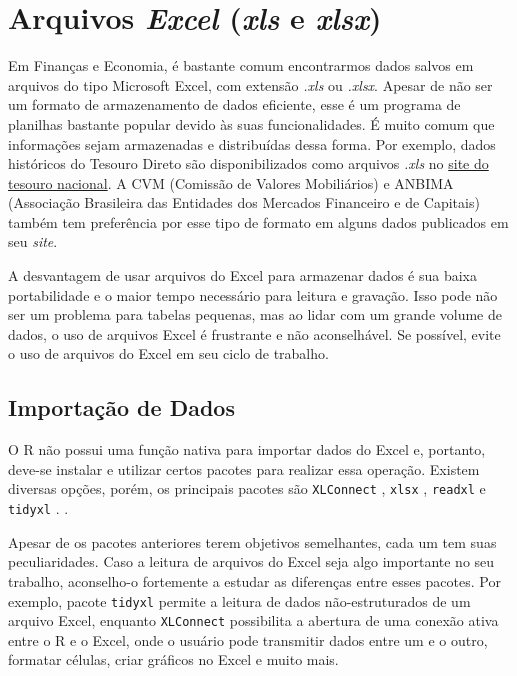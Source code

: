 \documentclass[
  11pt,
]{book}
\begin{document}
\hypertarget{arquivos-excel-xls-e-xlsx}{%
\section{\texorpdfstring{Arquivos \emph{Excel} (\emph{xls} e \emph{xlsx})}{Arquivos Excel (xls e xlsx)}}\label{arquivos-excel-xls-e-xlsx}}

Em Finanças e Economia, é bastante comum encontrarmos dados salvos em arquivos do tipo Microsoft Excel, com extensão \emph{.xls} ou \emph{.xlsx}. Apesar de não ser um formato de armazenamento de dados eficiente, esse é um programa de planilhas bastante popular devido às suas funcionalidades. É muito comum que informações sejam armazenadas e distribuídas dessa forma. Por exemplo, dados históricos do Tesouro Direto são disponibilizados como arquivos \emph{.xls} no \href{http://www.tesouro.gov.br/tesouro-direto-balanco-e-estatisticas}{site do tesouro nacional}. A CVM (Comissão de Valores Mobiliários) e ANBIMA (Associação Brasileira das Entidades dos Mercados Financeiro e de Capitais) também tem preferência por esse tipo de formato em alguns dados publicados em seu \emph{site}.

A desvantagem de usar arquivos do Excel para armazenar dados é sua baixa portabilidade e o maior tempo necessário para leitura e gravação. Isso pode não ser um problema para tabelas pequenas, mas ao lidar com um grande volume de dados, o uso de arquivos Excel é frustrante e não aconselhável. Se possível, evite o uso de arquivos do Excel em seu ciclo de trabalho.

\hypertarget{importauxe7uxe3o-de-dados-1}{%
\subsection{Importação de Dados}\label{importauxe7uxe3o-de-dados-1}}

O R não possui uma função nativa para importar dados do Excel e, portanto, deve-se instalar e utilizar certos pacotes para realizar essa operação. Existem diversas opções, porém, os principais pacotes são \texttt{XLConnect} \citep{R-XLConnect}, \texttt{xlsx} \citep{R-xlsx}, \texttt{readxl} \citep{R-readxl} e \texttt{tidyxl} \citep{R-tidyxl}.    .

Apesar de os pacotes anteriores terem objetivos semelhantes, cada um tem suas peculiaridades. Caso a leitura de arquivos do Excel seja algo importante no seu trabalho, aconselho-o fortemente a estudar as diferenças entre esses pacotes. Por exemplo, pacote \texttt{tidyxl} permite a leitura de dados não-estruturados de um arquivo Excel, enquanto \texttt{XLConnect} possibilita a abertura de uma conexão ativa entre o R e o Excel, onde o usuário pode transmitir dados entre um e o outro, formatar células, criar gráficos no Excel e muito mais.
\end{document}
